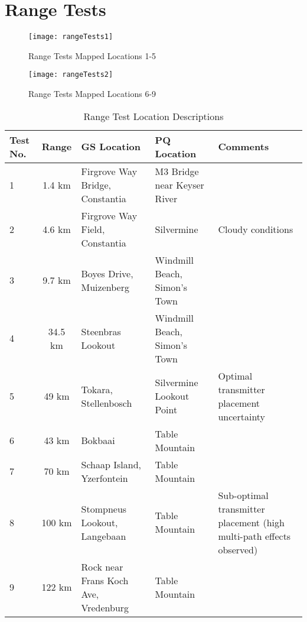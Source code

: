 \section{Range Tests}\label{sec:appendix_range}
\begin{figure}[!htb]
  \centering
  \texttt{[image: rangeTests1]}
  \caption{Range Tests Mapped Locations 1-5}
  \label{fig:rangeTests1}
\end{figure}
\begin{figure}[!htb]
  \centering
  \texttt{[image: rangeTests2]}
  \caption{Range Tests Mapped Locations 6-9}
  \label{fig:rangeTests2}
\end{figure}
\begin{table}[!htb]
  \centering
  \renewcommand{\arraystretch}{1.2}
  \begin{tabular}{ |p{1cm}|c|p{4cm}|p{4cm}|p{3cm}| }
  \hline
  \textbf{Test No.}         & \textbf{Range}        & \textbf{GS Location}      & \textbf{PQ Location}      & \textbf{Comments} \\ 
  \hline
  1                         
  & 1.4 km  
  & Firgrove Way Bridge, Constantia
  & M3 Bridge near Keyser River
  & \\ \hline
  2
  & 4.6 km  
  & Firgrove Way Field, Constantia
  & Silvermine
  & Cloudy conditions \\ \hline
  3
  & 9.7 km  
  & Boyes Drive, Muizenberg
  & Windmill Beach, Simon's Town
  & \\ \hline
  4
  & 34.5 km  
  & Steenbras Lookout
  & Windmill Beach, Simon's Town
  & \\ \hline
  5
  & 49 km  
  & Tokara, Stellenbosch  
  & Silvermine Lookout Point
  & Optimal transmitter placement uncertainty \\ \hline
  6
  & 43 km  
  & Bokbaai
  & Table Mountain
  & \\ \hline
  7
  & 70 km  
  & Schaap Island, Yzerfontein
  & Table Mountain
  & \\ \hline
  8
  & 100 km  
  & Stompneus Lookout, Langebaan
  & Table Mountain
  & Sub-optimal transmitter placement (high multi-path effects observed) \\ \hline
  9
  & 122 km  
  & Rock near Frans Koch Ave, Vredenburg
  & Table Mountain
  & \\ \hline
  \end{tabular}
  \caption{Range Test Location Descriptions}
  \label{tab:rangeTestLocations}
\end{table}

